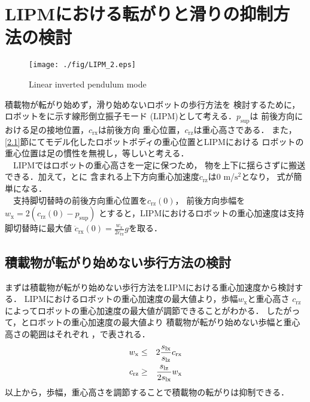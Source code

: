 \section{LIPMにおける転がりと滑りの抑制方法の検討}
\label {3}
\begin{figure}[t]
  \begin{center}
  \texttt{[image: ./fig/LIPM\_2.eps]}
  \caption{Linear inverted pendulum mode}
\end{center}
\end{figure}

積載物が転がり始めず，滑り始めないロボットの歩行方法を
検討するために，ロボットをに示す線形倒立振子モード
(LIPM)\cite{refer8}として考える．${p}_{\mathrm{sup}}$は
前後方向における足の接地位置，${c}_{\mathrm{rx}}$は前後方向
重心位置，${c}_{\mathrm{rz}}$は重心高さである．
また，\ref{2.1}節にてモデル化したロボットボディの重心位置とLIPMにおける
ロボットの重心位置は足の慣性を無視し，等しいと考える．\\
　LIPMではロボットの重心高さを一定に保つため，
物を上下に揺らさずに搬送できる．加えて，とに
含まれる上下方向重心加速度$\ddot{c}_{\mathrm{rz}}$は0 m/${\mathrm{s}^2}$となり，
式が簡単になる．\\
　支持脚切替時の前後方向重心位置を${c}_{\mathrm{rz}}(0)$，
前後方向歩幅を${w}_{\mathrm{x}}=2({c}_{\mathrm{rz}}(0)-{p}_{\mathrm{sup}})$
とすると，LIPMにおけるロボットの重心加速度は支持脚切替時に最大値
${\ddot{c}_{\mathrm{rx}}}(0)=\frac{{w}_{\mathrm{x}}}{2{c}_{\mathrm{rz}}}g$を取る．

\subsection{積載物が転がり始めない歩行方法の検討}
\label {3.1}
まずは積載物が転がり始めない歩行方法をLIPMにおける重心加速度から検討する．
LIPMにおけるロボットの重心加速度の最大値より，歩幅${w}_{\mathrm{x}}$と重心高さ
${c}_{\mathrm{rz}}$によってロボットの重心加速度の最大値が調節できることがわかる．
したがって，とロボットの重心加速度の最大値より
積載物が転がり始めない歩幅と重心高さの範囲はそれぞれ
，で表される．\\
\begin{eqnarray}
  \equlabel{1.8}
  {w}_{\mathrm{x}} &\leq& 2\frac{{s}_{\mathrm{lx}}}{{s}_{\mathrm{lz}}}{c}_{\mathrm{rx}}\\
  \equlabel{1.9}
  {c}_{\mathrm{rz}} &\geq& \frac{{s}_{\mathrm{lz}}}{2{s}_{\mathrm{lx}}}{w}_{\mathrm{x}}
\end{eqnarray}
以上から，歩幅，重心高さを調節することで積載物の転がりは抑制できる．
